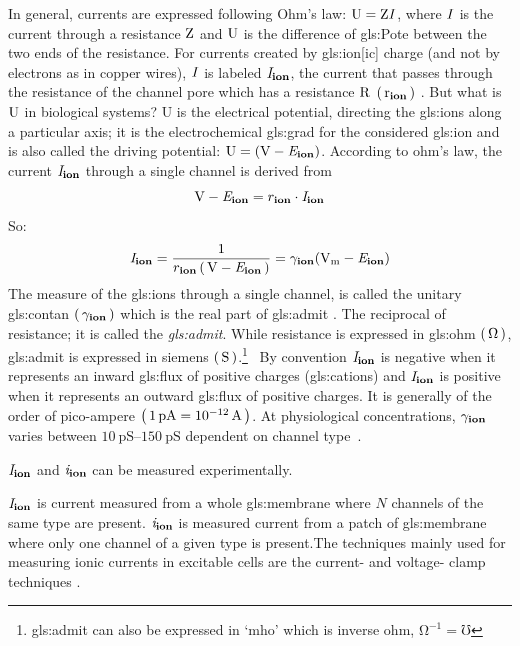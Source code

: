 \documentclass[class={myRUCProject}, crop=false]{standalone}
\begin{document}
In general, currents are expressed following Ohm's law: \(\mathrm{U}=\mathrm{Z}\mathit{I}\), where \(\mathit{I}\) is the current through a resistance \(\mathrm{Z}\) and \(\mathrm{U}\) is the difference of \gls{gls:Pote} between the two ends of the resistance. 
For currents created by \gls{gls:ion}[ic] charge (and not by electrons as in copper wires), \(\mathit{I}\) is labeled \(\mathit{I}_\mathbf{ion}\), the current that passes through the resistance of the channel pore which has a resistance \(\mathrm{R}\) \(\left(\,\mathrm{r}_\mathbf{ion}\,\right)\) \cite{Hammond2015ch3}. 
%
But what is \(\mathrm{U}\) in biological systems? 
%
\unit{U} is the electrical potential, directing the \glspl{gls:ion} along a particular axis; it is the electrochemical \gls{gls:grad} for the considered \gls{gls:ion} and is also called the driving potential: \(\rmm{U}=(\unit{\V} - \equi\ion)\). According to ohm's law, the current \(\mathit{I}_\mathbf{ion}\) through a single channel is derived from 
\begin{equation}
  \unit{\V} - \equi\ion = r\ion \cdot \curr\ion
\end{equation}
So:
\begin{equation}\label{eq:cur2con}
  \curr\ion= \frac{1}{r\ion\br{\unit{\V} - \equi\ion}} = \ucon\ion(\unit{\V\membrane} - \equi\ion)
\end{equation}
The measure of the \glspl{gls:ion} through a single channel, is called the unitary \gls{gls:contan} \(\left(\,\gamma_\mathbf{ion}\,\right)\) which is the real part of \gls{gls:admit} \cite{Hammond2015ch3}. 
The reciprocal of resistance; it is called the \textit{\gls{gls:admit}}.
While resistance is expressed in \gls{gls:ohm} \(\br{\unit{\ohm}}\), \gls{gls:admit} is expressed in siemens \(\br{\unit{\siemens}}\).\footnote{\Gls{gls:admit} can also be expressed in `mho' which is inverse ohm, \(\unit{\ohm}^{-1} = \unit{\mho}\)}~
By convention \(\mathit{I}_\mathbf{ion}\) is negative when it represents an inward \gls{gls:flux} of positive charges (\glspl{gls:cation}) and \(\mathit{I}_\mathbf{ion}\) is positive when it represents an outward \gls{gls:flux} of positive charges. It is generally of the order of pico-ampere \(\br{\qty{1}{\pico\ampere}=\qty{e-12}{\ampere}}\). At physiological concentrations, \(\gamma_\mathbf{ion}\) varies between \(\qtyrange{10}{150}{\pico\siemens}\) dependent on channel type~\cite{Hammond2015ch4}.

\(\mathit{I}_\mathbf{ion}\) and \(\mathit{i}_\mathbf{ion}\) can be measured experimentally. 

{}\(\mathit{I}_\mathbf{ion}\) is current measured from a whole \gls{gls:membrane} where \(N\) channels of the same type are present. \(\mathit{i}_\mathbf{ion}\) is measured current from a patch of \gls{gls:membrane} where only one channel of a given type is present.The techniques mainly used for measuring ionic currents in excitable cells are the current- and voltage- clamp techniques \cite{Hammond2015ch4}.
\end{document}

